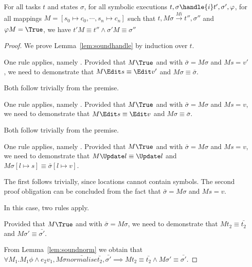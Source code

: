 \begin{lemma}
  \label{lem:soundhandle}

  For all tasks $t$ and states $\sigma$,
  for all symbolic executions $t,\sigma\handle{i} t',\sigma',\phi$,
  for all mappings $M = [s_0\mapsto c_0,\cdots,s_n\mapsto c_n]$
  such that $t,M \sigma \xrightarrow[]{M i} t'',\sigma''$ and $\phi M = \True$,
  we have $t'M \equiv t'' \wedge \sigma' M \equiv \sigma''$
\end{lemma}

\begin{proof}
  We prove Lemma~\ref{lem:soundhandle} by induction over $t$.\\

    {One rule applies, namely .
    Provided that $M\True$ and  with $\bar{\sigma}=M\sigma$ and $M s = v'$,
    we need to demonstrate that $M \Edit s\equiv \Edit v'$ and $ M\sigma\equiv \bar{\sigma}$.

    Both follow trivially from the premise.

    }

  {One rule applies, namely .
  Provided that $M\True$ and  with $\bar{\sigma}=M\sigma$ and $M s = v$,
  we need to demonstrate that $M \Edit s \equiv \Edit v$ and $ M\sigma\equiv \bar{\sigma}$.

  Both follow trivially from the premise.

  }

  {One rule applies, namely .
  Provided that $M\True$ and  with $\bar{\sigma}=M\sigma$ and $M s = v$,
  we need to demonstrate that $M \Update l \equiv \Update l$ and $ M\sigma[l\mapsto s]\equiv \bar{\sigma}[l\mapsto v]$.

  The first follows trivially, since locations cannot contain symbols. The second proof obligation can be concluded from the fact that $\bar{\sigma}=M\sigma$ and $M s = v$.

  }

  {In this case, two rules apply.\\
      {Provided that $M\True$ and  with $\bar{\sigma}=M\sigma$,
      we need to demonstrate that $M t_2 \equiv \bar{t_2}$ and $M\sigma'\equiv\bar{\sigma'}$.

      From Lemma~\ref{lem:soundnorm} we obtain that $\forall M_1. M_1 \phi \land e_2 v_1,M\sigma\bar{normalise}\bar{t_2},\bar{\sigma'}\implies M t_2\equiv\bar{t_2}\land M \sigma'\equiv\bar{\sigma'}$.

}}
\end{proof}
